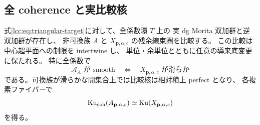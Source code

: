 

\subsection{全 coherence と実比較核}

\begin{theorem}
\label{lcc:thm:universal-linear-kernel}
式\eqref{lcc:eq:triangular-target}に対して、全係数環 $T$ 上の
実 dg Morita 双加群と逆双加群が存在し、
非可換族 $A$ と $X_{\mathbf p,\alpha,c}$ の残余線束圏を比較する。
この比較は中心超平面への制限を intertwine し、
単位・余単位とともに任意の導来底変更に保たれる。
特に全係数で
\[
 \mathcal A_A\text{ が smooth}
       \quad\Longleftrightarrow\quad
 X_{\mathbf p,\alpha,c}\text{ が滑らか}
\]
である。可換族が滑らかな開集合上では比較核は相対積上 perfect となり、
各複素ファイバーで
\[
 \operatorname{Ku}_{\mathrm{coh}}(A_{\mathbf p,\alpha,c})
       \simeq\operatorname{Ku}(X_{\mathbf p,\alpha,c})
\]
を得る。
\end{theorem}


